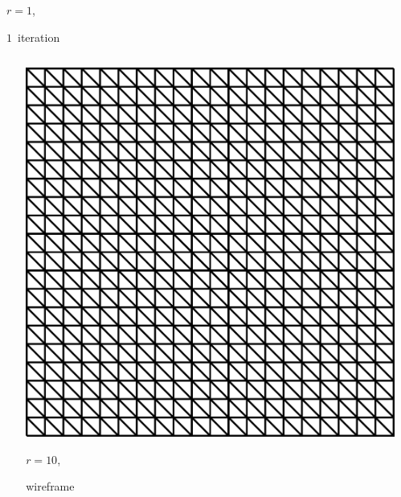 \documentclass[aspectratio=169,t]{beamer}
\begin{document}
{\begin{columns}
\begin{column}{0.22\textwidth}
			{\footnotesize
				\par \vspace{-1mm} $r=1$,
				\par \vspace{-1mm} $1$~iteration
			}
		\end{column}
		\begin{column}{0.17\textwidth}~\end{column}
	\end{columns}
	\vspace*{4mm}
	\begin{columns}
		\begin{column}{0.17\textwidth}~\end{column}
		\begin{column}{0.22\textwidth}
			\centering
			\includegraphics[width=.85\textwidth]{data/synthetic_meshes/square_tesselation_2tri_Dirac_delta_10_v441_f800_wireframe.png}
			{\footnotesize
				\par \vspace{-1mm} $r=10$,
				\par \vspace{-1mm} wireframe
			}
		\end{column}
		\begin{column}{0.22\textwidth}
			\centering

\end{column}
\end{columns}}
\end{document}
